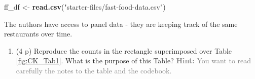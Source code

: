 \documentclass[
]{article}
\newenvironment{Shaded}{\begin{snugshade}}{\end{snugshade}}
\newcommand{\FunctionTok}[1]{\textcolor[rgb]{0.13,0.29,0.53}{\textbf{#1}}}
\newcommand{\NormalTok}[1]{#1}
\newcommand{\OtherTok}[1]{\textcolor[rgb]{0.56,0.35,0.01}{#1}}
\newcommand{\StringTok}[1]{\textcolor[rgb]{0.31,0.60,0.02}{#1}}
\providecommand{\tightlist}{%
  \setlength{\itemsep}{0pt}\setlength{\parskip}{0pt}}
\begin{document}
\begin{Shaded}
\begin{Highlighting}[]
\NormalTok{ff\_df }\OtherTok{\textless{}{-}} \FunctionTok{read.csv}\NormalTok{(}\StringTok{"starter{-}files/fast{-}food{-}data.csv"}\NormalTok{)}
\end{Highlighting}
\end{Shaded}

The authors have access to panel data - they are keeping track of the
same restaurants over time.

\begin{enumerate}
\def\labelenumi{\arabic{enumi}.}
\setcounter{enumi}{10}
\tightlist
\item
  (4 p) Reproduce the counts in the rectangle superimposed over Table
  \ref{fig:CK_Tab1}. What is the purpose of this Table?
  \textcolor{gray}{\textbf{Hint:} You want to read carefully the notes to the table and the codebook.}
\end{enumerate}
\end{document}
